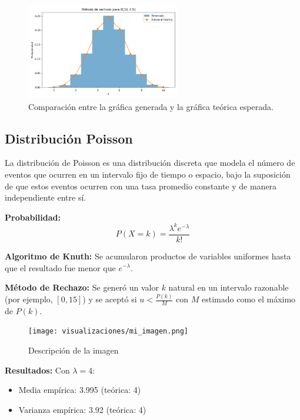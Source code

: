 \documentclass{article}
\begin{document}
\begin{figure}[H]
    \centering
    \includegraphics[width=0.6\textwidth]{visualizaciones/binomial_rechazo.png}
    \caption{Comparación entre la gráfica generada y la gráfica teórica esperada.}
    \label{fig:binomial_rechazo}
\end{figure}

\subsection{Distribución Poisson}
La distribución de Poisson es una distribución discreta que modela el número de eventos que ocurren en un intervalo fijo de tiempo o espacio, bajo la suposición de que estos eventos ocurren con una tasa promedio constante y de manera independiente entre sí.

\textbf{Probabilidad:}
\begin{equation}
P(X = k) = \frac{\lambda^k e^{-\lambda}}{k!}
\end{equation}

\textbf{Algoritmo de Knuth:} Se acumularon productos de variables uniformes hasta que el resultado fue menor que $e^{-\lambda}$.

\textbf{Método de Rechazo:} Se generó un valor $k$ natural en un intervalo razonable (por ejemplo, $[0,15]$) y se aceptó si $u < \frac{P(k)}{M}$ con $M$ estimado como el máximo de $P(k)$.
\begin{figure}[H] %
    \centering
    \texttt{[image: visualizaciones/mi\_imagen.png]}
    \caption{Descripción de la imagen}
    \label{fig:mi_imagen}
\end{figure}

\textbf{Resultados:} Con $\lambda=4$:
\begin{itemize}
\item Media empírica: 3.995 (teórica: 4)
\item Varianza empírica: 3.92 (teórica: 4)
\end{itemize}
\end{document}
